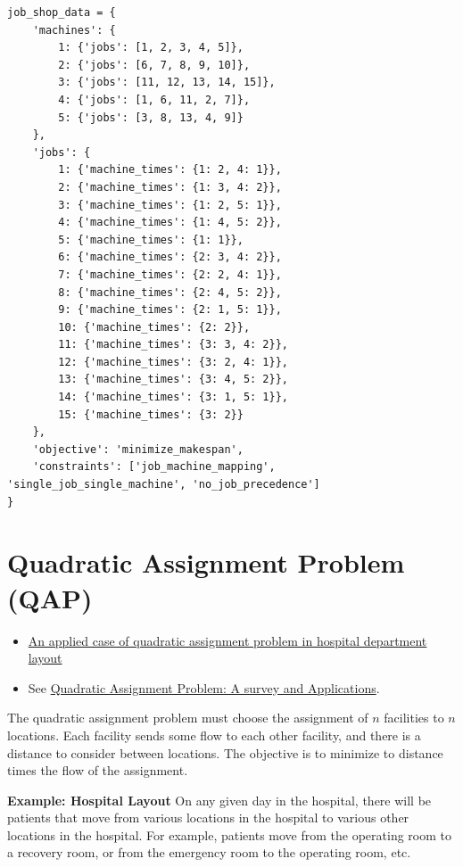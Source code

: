 {\begin{verbatim}
job_shop_data = {
    'machines': {
        1: {'jobs': [1, 2, 3, 4, 5]},
        2: {'jobs': [6, 7, 8, 9, 10]},
        3: {'jobs': [11, 12, 13, 14, 15]},
        4: {'jobs': [1, 6, 11, 2, 7]},
        5: {'jobs': [3, 8, 13, 4, 9]}
    },
    'jobs': {
        1: {'machine_times': {1: 2, 4: 1}},
        2: {'machine_times': {1: 3, 4: 2}},
        3: {'machine_times': {1: 2, 5: 1}},
        4: {'machine_times': {1: 4, 5: 2}},
        5: {'machine_times': {1: 1}},
        6: {'machine_times': {2: 3, 4: 2}},
        7: {'machine_times': {2: 2, 4: 1}},
        8: {'machine_times': {2: 4, 5: 2}},
        9: {'machine_times': {2: 1, 5: 1}},
        10: {'machine_times': {2: 2}},
        11: {'machine_times': {3: 3, 4: 2}},
        12: {'machine_times': {3: 2, 4: 1}},
        13: {'machine_times': {3: 4, 5: 2}},
        14: {'machine_times': {3: 1, 5: 1}},
        15: {'machine_times': {3: 2}}
    },
    'objective': 'minimize_makespan',
    'constraints': ['job_machine_mapping', 'single_job_single_machine', 'no_job_precedence']
}
\end{verbatim}

\section{Quadratic Assignment Problem (QAP)}
\begin{resource}{}{}
\begin{itemize}
\item \href{https://ieeexplore-ieee-org.ezproxy.lib.vt.edu/stamp/stamp.jsp?tp=&arnumber=7170278}{An applied case of quadratic assignment problem in hospital department layout}
\item See \href{https://www.semanticscholar.org/paper/Quadratic-Assignment-Problem%3A-A-survey-and-Shawky-Metwally/247b45613d6d3b6961fdad44f9e7fefb70fd3e82}{Quadratic Assignment Problem: A survey and Applications}.
\end{itemize}
\end{resource}
The quadratic assignment problem must choose the assignment of $n$ facilities to $n$ locations.  Each facility sends some flow to each other facility, and there is a distance to consider between locations.   
The objective is to minimize to distance times the flow of the assignment.


\textbf{Example:  Hospital Layout}
On any given day in the hospital, there will be patients that move from various locations in the hospital to various other locations in the hospital.  For example, patients move from the operating room to a recovery room, or from the emergency room to the operating room, etc.

}
